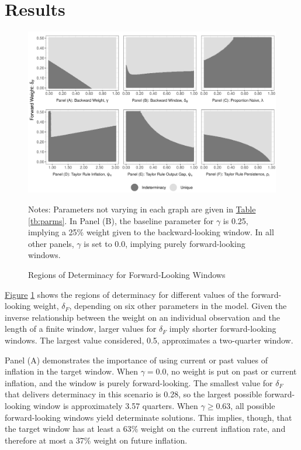 \documentclass[english,authoryear,12pt]{elsarticle}
\begin{document}
\section{Results}

\begin{figure}
	\captionsetup{justification=centering}
	\begin{center}
		\includegraphics[width=\textwidth]{./determinacy_notitle.png}
		\vspace*{3pc}\hspace*{2pc}\parbox{0.9\textwidth}{\small{
			Notes: Parameters not varying in each graph are given in \href{tb:parms}{Table} \ref{tb:parms}. In Panel (B), the baseline parameter for $\gamma$ is 0.25, implying a 25\% weight given to the backward-looking window. In all other panels, $\gamma$ is set to 0.0, implying purely forward-looking windows.}
		}
	\end{center}
	\vspace*{-4pc}\caption{Regions of Determinacy for Forward-Looking Windows}\label{fg:determinacy}
\end{figure}

\href{fg:determinacy}{Figure} \ref{fg:determinacy} shows the regions of determinacy for different values of the forward-looking weight, $\delta_F$, depending on six other parameters in the model. Given the inverse relationship between the weight on an individual observation and the length of a finite window, larger values for $\delta_F$ imply shorter forward-looking windows. The largest value considered, 0.5, approximates a two-quarter window.

Panel (A) demonstrates the importance of using current or past values of inflation in the target window. When $\gamma=0.0$, no weight is put on past or current inflation, and the window is purely forward-looking. The smallest value for $\delta_F$ that delivers determinacy in this scenario is 0.28, so the largest possible forward-looking window is approximately 3.57 quarters. When $\gamma \geq 0.63$, all possible forward-looking windows yield determinate solutions. This implies, though, that the target window has at least a 63\% weight on the current inflation rate, and therefore at most a 37\% weight on future inflation.
\end{document}
